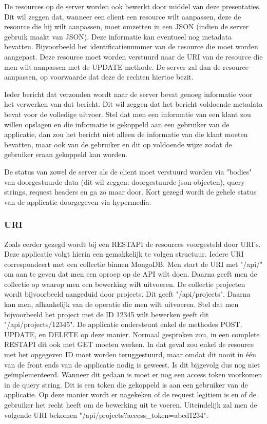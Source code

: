 \documentclass[a4paper,11pt]{article}
\begin{document}
De resources op de server worden ook bewerkt door middel van deze presentaties. Dit wil zeggen dat, wanneer een client een resource wilt aanpassen, deze de resource die hij wilt aanpassen, moet omzetten in een JSON (indien de server gebruik maakt van JSON). Deze informatie kan eventueel nog metadata bevatten. Bijvoorbeeld het identificatienummer van de resource die moet worden aangepast. Deze resource moet worden verstuurd naar de URI van de resource die men wilt aanpassen met de UPDATE methode. De server zal dan de resource aanpassen, op voorwaarde dat deze de rechten hiertoe bezit.

Ieder bericht dat verzonden wordt naar de server bevat genoeg informatie voor het verwerken van dat bericht. Dit wil zeggen dat het bericht voldoende metadata bevat voor de volledige uitvoer. Stel dat men een informatie van een klant zou willen opslagen en die informatie is gekoppeld aan een gebruiker van de applicatie, dan zou het bericht niet alleen de informatie van die klant moeten bevatten, maar ook van de gebruiker en dit op voldoende wijze zodat de gebruiker eraan gekoppeld kan worden.

De status van zowel de server als de client moet verstuurd worden via "bodies" van doorgestuurde data (dit wil zeggen: doorgestuurde json objecten), query strings, request headers en ga zo maar door. Kort gezegd wordt de gehele status van de applicatie doorgegeven via hypermedia.

\subsubsection{URI}
Zoals eerder gezegd wordt bij een RESTAPI de resources voorgesteld door URI's. Deze applicatie volgt hierin een gemakkelijk te volgen structuur. Iedere URI correspondeert met een collectie binnen MongoDB. Men start de URI met "/api/" om aan te geven dat men een oproep op de API wilt doen. Daarna geeft men de collectie op waarop men een bewerking wilt uitvoeren. De collectie projecten wordt bijvoorbeeld aangeduid door projects. Dit geeft "/api/projects". Daarna kan men, afhankelijk van de operatie die men wilt uitvoeren. Stel dat men bijvoorbeeld het project met de ID 12345 wilt bewerken geeft dit "/api/projects/12345". De applicatie ondersteunt enkel de methodes POST, UPDATE, en DELETE op deze manier. Normaal gesproken zou, in een complete RESTAPI dit ook met GET moeten werken. In dat geval zou enkel de resource met het opgegeven ID moet worden teruggestuurd, maar omdat dit nooit in één van de front ends van de applicatie nodig is geweest. Is dit bijgevolg dus nog niet geïmplementeerd. Wanneer dit gedaan is moet er nog een access token voorkomen in de query string. Dit is een token die gekoppeld is aan een gebruiker van de applicatie. Op deze manier wordt er nagekeken of de request legitiem is en of de gebruiker het recht heeft om de bewerking uit te voeren. Uiteindelijk zal men de volgende URI bekomen "/api/projects?access\_token=abcd1234".
\end{document}
